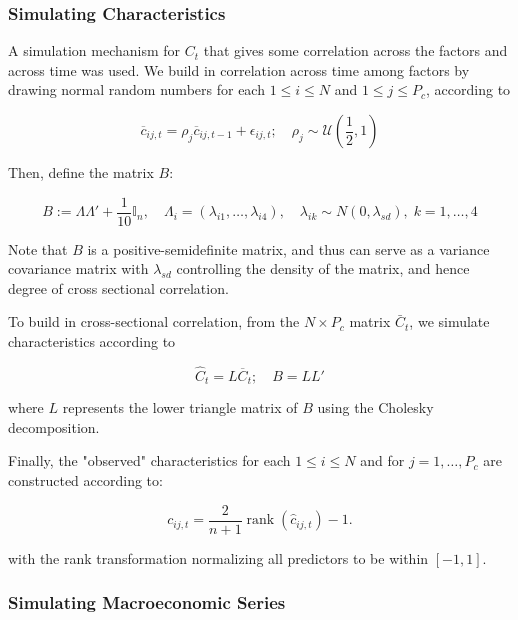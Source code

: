 \documentclass[a4paper, table]{article}
\begin{document}
\subsubsection{Simulating Characteristics}

A simulation mechanism for $C_t$ that gives some correlation across the factors and across time was used. We build in correlation across time among factors by drawing normal random numbers for each $1\leq i\leq N$ and $1\leq j\leq P_{c}$, according to 

\begin{equation}
	\overline{c}_{i j, t} = \rho_{j} \overline{c}_{i j, t-1}+\epsilon_{i j, t} ;
	\quad \rho_{j} \sim \mathcal{U} \left( \frac{1}{2},1 \right) 
\end{equation}

Then, define the matrix $B$:

\begin{equation}
	B:=\Lambda\Lambda' + \frac{1}{10}\mathbb{I}_{n}, \quad
	\Lambda_i = (\lambda_{i1},\dots,\lambda_{i4}), \quad
	\lambda_{ik}\sim N(0, \lambda_{sd}), \; k=1, \dots, 4
\end{equation}

Note that $B$ is a positive-semidefinite matrix, and thus can serve as a variance covariance matrix with $\lambda_{sd}$ controlling the density of the matrix, and hence degree of cross sectional correlation. 

To build in cross-sectional correlation, from the $N\times P_{c}$ matrix $\bar{C}_t$, we simulate characteristics according to
 
\begin{equation}
	\widehat{C}_{t}=L\overline{C}_{t} ; \quad B = LL' 
\end{equation}

where $L$ represents the lower triangle matrix of $B$ using the Cholesky decomposition.
 
Finally, the "observed" characteristics for each $1\leq i\leq N$ and for $j=1, \dots, P_{c}$ are constructed according to:

\begin{equation}
	c_{i j, t} = \frac{2}{n+1} \operatorname{rank}\left(\hat{c}_{i j, t}\right) - 1.
\end{equation}

with the rank transformation normalizing all predictors to be within $[-1, 1]$. 

\subsubsection{Simulating Macroeconomic Series}
\end{document}
